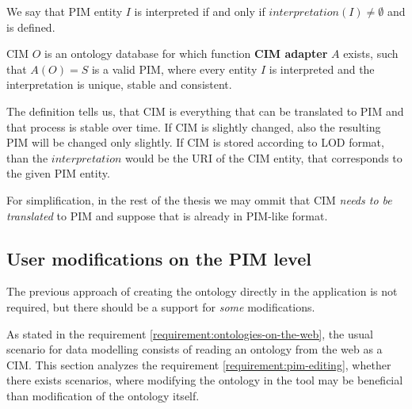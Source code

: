 \begin{definition}[interpretation]
    We say that PIM entity $I$ is interpreted if and only if $interpretation(I) \neq \emptyset$ and is defined.
\end{definition}

\begin{definition}[CIM]
CIM $O$ is an ontology database for which function \textbf{CIM adapter} $A$ exists, such that $A(O) = S$ is a valid PIM, where every entity $I$ is interpreted and the interpretation is unique, stable and consistent.
\end{definition}

The definition tells us, that CIM is everything that can be translated to PIM and that process is stable over time. If CIM is slightly changed, also the resulting PIM will be changed only slightly. If CIM is stored according to LOD format, than the $interpretation$ would be the URI of the CIM entity, that corresponds to the given PIM entity.

For simplification, in the rest of the thesis we may ommit that CIM \textit{needs to be translated} to PIM and suppose that is already in PIM-like format.




\newpage\subsection{User modifications on the PIM level}


\begin{requirement}
    \label{requirement:pim-editing}
    The previous approach of creating the ontology directly in the application is not required, but there should be a support for \textit{some} modifications.
\end{requirement}

As stated in the requirement \ref{requirement:ontologies-on-the-web}, the usual scenario for data modelling consists of reading an ontology from the web as a CIM. This section analyzes the requirement \ref{requirement:pim-editing}, whether there exists scenarios, where modifying the ontology in the tool may be beneficial than modification of the ontology itself.

